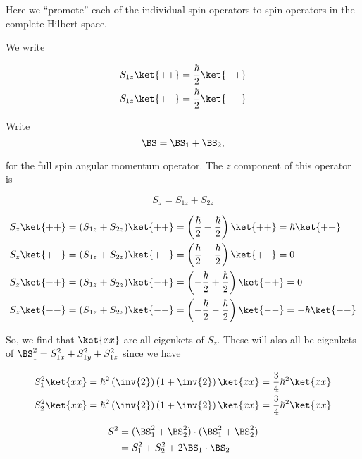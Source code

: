 Here we ``promote'' each of the individual spin operators to spin operators in the complete Hilbert space.

We write

\begin{align}\label{eqn:qmTwoL16:250}
S_{1z}\ket{++} &= \frac{\hbar}{2} \ket{++} \\
S_{1z}\ket{+-} &= \frac{\hbar}{2} \ket{+-}
\end{align}

Write
\begin{equation}\label{eqn:qmTwoL16:270}
\BS = \BS_1 + \BS_2,
\end{equation}

for the full spin angular momentum operator.  The $z$ component of this operator is 

\begin{equation}\label{eqn:qmTwoL16:290}
S_z = S_{1z} + S_{2z}
\end{equation}

\begin{align}\label{eqn:qmTwoL16:310}
S_z\ket{++} &= (S_{1z} + S_{2z}) \ket{++} = \left( \frac{\hbar}{2} +\frac{\hbar}{2} \right) \ket{++} = \hbar \ket{++} \\ 
S_z\ket{+-} &= (S_{1z} + S_{2z}) \ket{+-} = \left( \frac{\hbar}{2} -\frac{\hbar}{2} \right) \ket{+-} = 0 \\
S_z\ket{-+} &= (S_{1z} + S_{2z}) \ket{-+} = \left( -\frac{\hbar}{2} +\frac{\hbar}{2} \right) \ket{-+} = 0 \\
S_z\ket{--} &= (S_{1z} + S_{2z}) \ket{--} = \left( -\frac{\hbar}{2} -\frac{\hbar}{2} \right) \ket{--} = -\hbar \ket{--} 
\end{align}

So, we find that $\ket{x x}$ are all eigenkets of $S_z$.  These will also all be eigenkets of $\BS_1^2 = S_{1x}^2 +S_{1y}^2 +S_{1z}^2$ since we have

\begin{align}\label{eqn:qmTwoL16:330}
S_1^2 \ket{x x} &= \hbar^2 \left(\inv{2}\right) \left(1 + \inv{2}\right) \ket{x x} = \frac{3}{4} \hbar^2 \ket{x x} \\
S_2^2 \ket{x x} &= \hbar^2 \left(\inv{2}\right) \left(1 + \inv{2}\right) \ket{x x} = \frac{3}{4} \hbar^2 \ket{x x} 
\end{align}

\begin{equation}\label{eqn:qmTwoL16:350}
\begin{aligned}
S^2 &= 
(\BS_1^2
+\BS_2^2) 
\cdot
(\BS_1^2
+\BS_2^2)  \\
&= 
S_1^2 + S_2^2 + 2 \BS_1 \cdot \BS_2
\end{aligned}
\end{equation}

